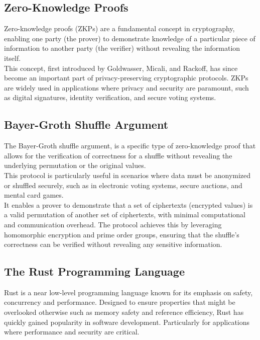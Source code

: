 \documentclass[12pt,a4paper]{report}
\begin{document}
\subsection{Zero-Knowledge Proofs}
Zero-knowledge proofs (ZKPs) are a fundamental concept in cryptography, enabling one party 
(the prover) to demonstrate knowledge of a particular piece of information to another party 
(the verifier) without revealing the information itself.\\


This concept, first introduced by Goldwasser, Micali, and Rackoff\cite{zk}, has since become 
an important part of privacy-preserving cryptographic protocols. 
ZKPs are widely used in applications where privacy and security are paramount, 
such as digital signatures, identity verification, and secure voting systems.

\subsection{Bayer-Groth Shuffle Argument}
The Bayer-Groth shuffle argument\cite{bgshuffle}, is a specific type of zero-knowledge proof that
allows for the verification of correctness for a shuffle without revealing 
the underlying permutation or the original values. \\
This protocol is particularly useful in scenarios where data must be anonymized or shuffled 
securely, such as in electronic voting systems, secure auctions, and mental card games. \\

It enables a prover to demonstrate that a set of ciphertexts (encrypted values) is a valid 
permutation of another set of ciphertexts, with minimal computational and communication overhead.
The protocol achieves this by leveraging homomorphic encryption and prime order groups, ensuring that the shuffle's correctness can be verified without revealing any sensitive information.

\subsection{The Rust Programming Language}
Rust\cite{rust} is a near low-level programming language known for its emphasis on safety, concurrency and performance.
Designed to ensure properties that might be overlooked otherwise such as memory safety and
reference efficiency, Rust has quickly gained popularity in software development. 
Particularly for applications where performance and security are critical.
\end{document}
